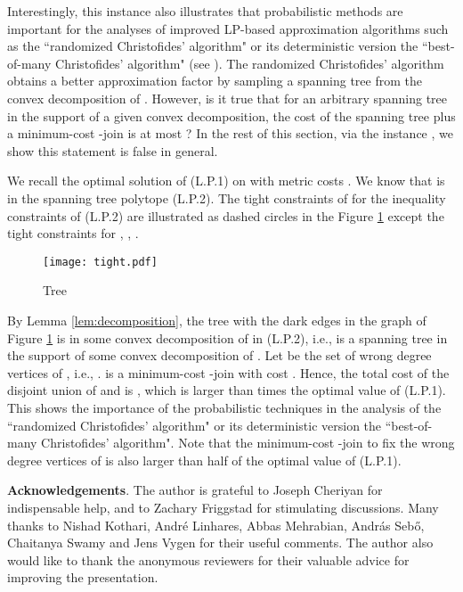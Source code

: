 \documentclass[11pt]{article}
\begin{document}
Interestingly, this instance also illustrates that probabilistic methods are
important for the analyses of improved LP-based approximation
algorithms such as the  ``randomized Christofides' algorithm" or its
deterministic version the ``best-of-many Christofides' algorithm"
(see \cite{AKS12}). The randomized Christofides' algorithm obtains a better approximation factor
by sampling a spanning tree  from the convex decomposition of .  However, is it true that for an arbitrary spanning tree in the support of a given convex decomposition,
the cost of the spanning tree plus a minimum-cost  -join is at most  ?
In the rest of this section, via the instance , we show this statement is false in general.

We recall the optimal solution  of (L.P.1) on  with metric costs . We know that  is in the spanning
tree polytope (L.P.2). The tight constraints of  for the inequality constraints of (L.P.2) are illustrated as dashed circles in the Figure \ref{TreeJB} except
the tight constraints for , , .
\begin{figure}[h]
\begin{center}
\texttt{[image: tight.pdf]}\\
  \caption{Tree }
  \label{TreeJB}
\end{center}
\end{figure}

By Lemma \ref{lem:decomposition}, the tree  with the dark edges in the graph of Figure \ref{TreeJB} is in some convex decomposition of  in (L.P.2),
i.e.,  is a spanning tree in the support of some convex decomposition of . Let  be the set of wrong degree vertices of , i.e., .  is a minimum-cost -join with cost . Hence, the total cost
of the disjoint union of  and  is , which is larger than  times the optimal value  of (L.P.1). This shows the importance of the probabilistic techniques in the analysis of
the ``randomized Christofides' algorithm" or its
deterministic version the ``best-of-many Christofides' algorithm". Note that the minimum-cost -join  to
fix the wrong degree vertices of  is also larger than half of the optimal value  of (L.P.1).

\medskip
\noindent
{\bf Acknowledgements}.
The author is grateful to Joseph Cheriyan for indispensable help, and to Zachary Friggstad for stimulating discussions.  Many thanks to Nishad Kothari, Andr\'{e} Linhares, Abbas Mehrabian, Andr\'{a}s Seb\H{o}, Chaitanya Swamy and Jens Vygen for their useful comments. The author also would like to thank the anonymous reviewers for their valuable advice for improving the presentation.





\end{document}

